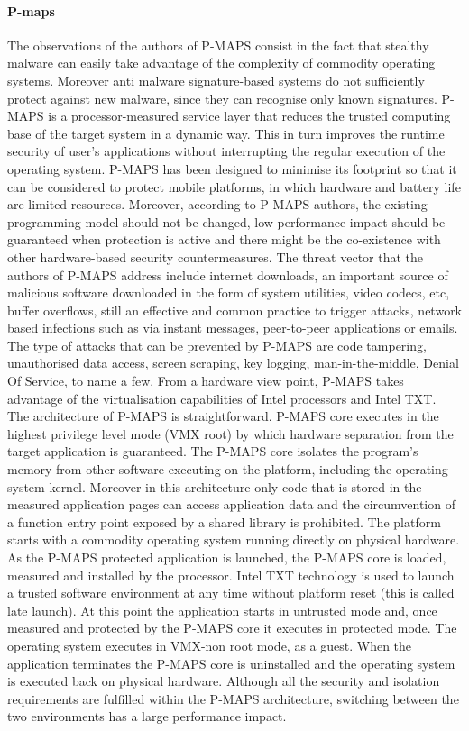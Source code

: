 \paragraph{P-maps}
The observations of the authors of P-MAPS \cite{pmaps} consist in the fact that stealthy malware can easily take advantage of the complexity of commodity operating systems. Moreover anti malware signature-based systems do not sufficiently protect against new malware, since they can recognise only known signatures. P-MAPS is a processor-measured service layer that reduces the trusted computing base of the target system in a dynamic way. This in turn improves the runtime security of user's applications without interrupting the regular execution of the operating system. P-MAPS has been designed to minimise its footprint so that it can be considered to protect mobile platforms, in which hardware and battery life are limited resources.
Moreover, according to P-MAPS authors, the existing programming model should not be changed, low performance impact should be guaranteed when protection is active and there might be the co-existence with other hardware-based security countermeasures.
The threat vector that the authors of P-MAPS address include internet downloads, an important source of malicious software downloaded in the form of system utilities, video codecs, etc, buffer overflows, still an effective and common practice to trigger attacks, network based infections such as via instant messages, peer-to-peer applications or emails. The type of attacks that can be prevented by P-MAPS are code tampering, unauthorised data access, screen scraping, key logging, man-in-the-middle, Denial Of Service, to name a few.
From a hardware view point, P-MAPS takes advantage of the virtualisation capabilities of Intel processors and Intel TXT.
The architecture of P-MAPS is straightforward. P-MAPS core executes in the highest privilege level mode (VMX root) by which hardware separation from the target application is guaranteed. The P-MAPS core isolates the program's memory from other software executing on the platform, including the operating system kernel. Moreover in this architecture only code that is stored in the measured application pages can access application data and the circumvention of a function entry point exposed by a shared library is prohibited. 
The platform starts with a commodity operating system running directly on physical hardware. As the P-MAPS protected application is launched, the P-MAPS core is loaded, measured and installed by the processor. Intel TXT technology is used to launch a trusted software environment at any time without platform reset (this is called late launch). At this point the application starts in untrusted mode and, once measured and protected by the P-MAPS core it executes in protected mode. The operating system executes in VMX-non root mode, as a guest. When the application terminates the P-MAPS core is uninstalled and the operating system is executed back on physical hardware.
Although all the security and isolation requirements are fulfilled within the P-MAPS architecture, switching between the two environments has a large performance impact. 


